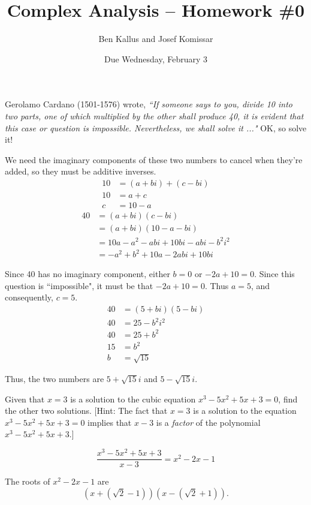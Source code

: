 \documentclass[11pt]{article}       %
\title{Complex Analysis -- Homework \#0}
\author{ Ben Kallus and Josef Komissar }
\date{ Due Wednesday, February 3 }
\theoremstyle{definition}
\begin{document}
\pagecolor{black}
\color{white}
\maketitle

  Gerolamo Cardano (1501-1576) wrote,
{\sl ``If someone says to you, divide 10 into two parts, one of which multiplied by the other shall produce 40, it is evident that this case or question is impossible. Nevertheless, we shall solve it ..."} \quad 
OK, so solve it!

    We need the imaginary components of these two numbers to cancel when they're added, so they must be additive inverses.
    \begin{align*}
        10 &= (a+bi) + (c-bi) \\
        10 &= a + c \\
        c  &= 10 - a
    \end{align*}
    \begin{align*}
        40 &= (a+bi)(c-bi) \\
           &= (a+bi)(10-a-bi) \\
           &= 10a - a^2 - abi + 10bi - abi -b^2i^2 \\
           &= -a^2 + b^2 + 10a - 2abi + 10bi
    \end{align*}

    Since 40 has no imaginary component, either $b=0$ or $-2a+10=0$.
    Since this question is ``impossible", it must be that $-2a+10=0$.
    Thus $a=5$, and consequently, $c=5$.
    \begin{align*}
        40 &= (5+bi)(5-bi) \\
        40 &= 25 -b^2i^2 \\
        40 &= 25 + b^2 \\
        15 &= b^2 \\
        b  &= \sqrt{15}
    \end{align*}

    Thus, the two numbers are $5+\sqrt{15}i$ and $5-\sqrt{15}i$.

\newpage
{}  Given that $x=3$ is a solution to the cubic equation $x^3-5x^2+5x+3=0$, find the other two solutions. [{\sc Hint:} The fact that $x=3$ is a solution to the equation $x^3-5x^2+5x+3=0$ implies that $x-3$ is a \emph{factor} of the polynomial
$x^3-5x^2+5x+3$.]

    $$\frac{x^3-5x^2+5x+3}{x-3} = x^2-2x-1$$

    The roots of $x^2-2x-1$ are $$\left(x+\left(\sqrt{2}-1\right)\right)\left(x-\left(\sqrt{2}+1\right)\right).$$
\end{document}
